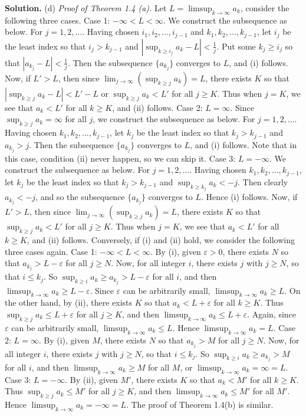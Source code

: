 \documentclass[12pt]{article}
\theoremstyle{definition}
\begin{document}
\smallskip
\noindent\textbf{Solution.}\quad
(d) \textit{Proof of Theorem 1.4 (a).} Let $L=\limsup_{k\to\infty}a_k$, consider the following three cases.
Case 1: $-\infty<L<\infty$. We construct the subsequence as below. For $j=1,2,\ldots$. Having chosen $i_1,i_2,\ldots,i_{j-1}$ and $k_1,k_2,\ldots,k_{j-1}$, let $i_j$ be the least index so that $i_j>k_{j-1}$ and $\left\vert \sup_{k\ge i_j}a_k-L\right\vert<\frac{1}{j}$. Put some $k_j\ge i_j$ so that $\left\vert a_{k_j}-L\right\vert<\frac{1}{j}$. Then the subsequence $\{a_{k_j}\}$ converges to $L$, and (i) follows. Now, if $L'>L$, then since $\lim_{j\to\infty}\left(\sup_{k\ge j}a_k\right)=L$, there exists $K$ so that $\left\vert\sup_{k\ge j}a_k-L\right\vert<L'-L$ or $\sup_{k\ge j}a_k<L'$ for all $j\ge K$. Thus when $j=K$, we see that $a_k<L'$ for all $k\ge K$, and (ii) follows.
Case 2: $L=\infty$. Since $\sup_{k\ge j}a_k=\infty$ for all $j$, we construct the subsequence as below. For $j=1,2,\ldots$. Having chosen $k_1,k_2,\ldots,k_{j-1}$, let $k_j$ be the least index so that $k_j>k_{j-1}$ and $a_{k_j}>j$. Then the subsequence $\{a_{k_j}\}$ converges to $L$, and (i) follows. Note that in this case, condition (ii) never happen, so we can skip it.
Case 3: $L=-\infty$. We construct the subsequence as below. For $j=1,2,\ldots$. Having chosen $k_1,k_2,\ldots,k_{j-1}$, let $k_j$ be the least index so that $k_j>k_{j-1}$ and $\sup_{k\ge k_j}a_{k}<-j$. Then clearly $a_{k_j}<-j$, and so the subsequence $\{a_{k_j}\}$ converges to $L$. Hence (i) follows. Now, if $L'>L$, then since $\lim_{j\to\infty}\left(\sup_{k\ge j}a_k\right)=L$, there exists $K$ so that $\sup_{k\ge j}a_k<L'$ for all $j\ge K$. Thus when $j=K$, we see that $a_k<L'$ for all $k\ge K$, and (ii) follows.
Conversely, if (i) and (ii) hold, we consider the following three cases again.
Case 1: $-\infty<L<\infty$. By (i), given $\varepsilon>0$, there exists $N$ so that $a_{k_j}>L-\varepsilon$ for all $j\ge N$. Now, for all integer $i$, there exists $j$ with $j\ge N$, so that $i\le k_j$. So $\sup_{k\ge i}a_k\ge a_{k_j}>L-\varepsilon$ for all $i$, and then $\limsup_{k\to\infty}a_k\ge L-\varepsilon$. Since $\varepsilon$ can be arbitrarily small, $\limsup_{k\to\infty}a_k\ge L$. On the other hand, by (ii), there exists $K$ so that $a_k< L+\varepsilon$ for all $k\ge K$. Thus $\sup_{k\ge j}a_k\le L+\varepsilon$ for all $j\ge K$, and then $\limsup_{k\to\infty}a_k\le L+\varepsilon$. Again, since $\varepsilon$ can be arbitrarily small, $\limsup_{k\to\infty}a_k\le L$. Hence $\limsup_{k\to\infty}a_k=L$.
Case 2: $L=\infty$. By (i), given $M$, there exists $N$ so that $a_{k_j}>M$ for all $j\ge N$. Now, for all integer $i$, there exists $j$ with $j\ge N$, so that $i\le k_j$. So $\sup_{k\ge i}a_k\ge a_{k_j}>M$ for all $i$, and then $\limsup_{k\to\infty}a_k\ge M$ for all $M$, or $\limsup_{k\to\infty}a_k=\infty=L$.
Case 3: $L=-\infty$. By (ii), given $M'$, there exists $K$ so that $a_k<M'$ for all $k\ge K$. Thus $\sup_{k\ge j}a_k\le M'$ for all $j\ge K$, and then $\limsup_{k\to\infty}a_k\le M'$ for all $M'$. Hence $\limsup_{k\to\infty}a_k=-\infty=L$.
The proof of Theorem 1.4(b) is similar.
\end{document}
